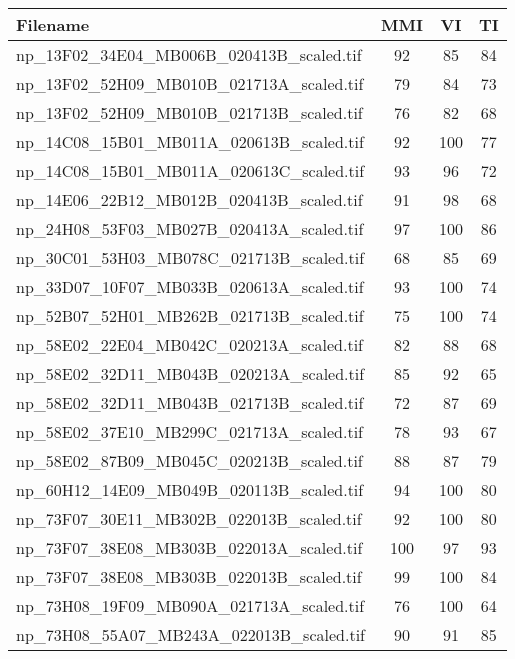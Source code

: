 \begin{tabular}{lccc}
\hline
 Filename                                 & MMI & VI  & TI \\ \hline \hline
 np\_13F02\_34E04\_MB006B\_020413B\_scaled.tif & 92  & 85  & 84 \\
 np\_13F02\_52H09\_MB010B\_021713A\_scaled.tif & 79  & 84  & 73 \\
 np\_13F02\_52H09\_MB010B\_021713B\_scaled.tif & 76  & 82  & 68 \\
 np\_14C08\_15B01\_MB011A\_020613B\_scaled.tif & 92  & 100 & 77 \\
 np\_14C08\_15B01\_MB011A\_020613C\_scaled.tif & 93  & 96  & 72 \\
 np\_14E06\_22B12\_MB012B\_020413B\_scaled.tif & 91  & 98  & 68 \\
 np\_24H08\_53F03\_MB027B\_020413A\_scaled.tif & 97  & 100 & 86 \\
 np\_30C01\_53H03\_MB078C\_021713B\_scaled.tif & 68  & 85  & 69 \\
 np\_33D07\_10F07\_MB033B\_020613A\_scaled.tif & 93  & 100 & 74 \\
 np\_52B07\_52H01\_MB262B\_021713B\_scaled.tif & 75  & 100 & 74 \\
 np\_58E02\_22E04\_MB042C\_020213A\_scaled.tif & 82  & 88  & 68 \\
 np\_58E02\_32D11\_MB043B\_020213A\_scaled.tif & 85  & 92  & 65 \\
 np\_58E02\_32D11\_MB043B\_021713B\_scaled.tif & 72  & 87  & 69 \\
 np\_58E02\_37E10\_MB299C\_021713A\_scaled.tif & 78  & 93  & 67 \\
 np\_58E02\_87B09\_MB045C\_020213B\_scaled.tif & 88  & 87  & 79 \\
 np\_60H12\_14E09\_MB049B\_020113B\_scaled.tif & 94  & 100 & 80 \\
 np\_73F07\_30E11\_MB302B\_022013B\_scaled.tif & 92  & 100 & 80 \\
 np\_73F07\_38E08\_MB303B\_022013A\_scaled.tif & 100 & 97  & 93 \\
 np\_73F07\_38E08\_MB303B\_022013B\_scaled.tif & 99  & 100 & 84 \\
 np\_73H08\_19F09\_MB090A\_021713A\_scaled.tif & 76  & 100 & 64 \\
 np\_73H08\_55A07\_MB243A\_022013B\_scaled.tif & 90  & 91  & 85 \\
\hline
\end{tabular}